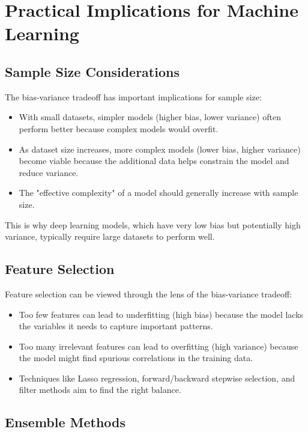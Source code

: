 \documentclass{article}
\begin{document}
\section{Practical Implications for Machine Learning}

\subsection{Sample Size Considerations}

The bias-variance tradeoff has important implications for sample size:

\begin{itemize}
\item With small datasets, simpler models (higher bias, lower variance) often perform better because complex models would overfit.
\item As dataset size increases, more complex models (lower bias, higher variance) become viable because the additional data helps constrain the model and reduce variance.
\item The "effective complexity" of a model should generally increase with sample size.
\end{itemize}

This is why deep learning models, which have very low bias but potentially high variance, typically require large datasets to perform well.

\subsection{Feature Selection}

Feature selection can be viewed through the lens of the bias-variance tradeoff:

\begin{itemize}
\item Too few features can lead to underfitting (high bias) because the model lacks the variables it needs to capture important patterns.
\item Too many irrelevant features can lead to overfitting (high variance) because the model might find spurious correlations in the training data.
\item Techniques like Lasso regression, forward/backward stepwise selection, and filter methods aim to find the right balance.
\end{itemize}

\subsection{Ensemble Methods}
\end{document}
